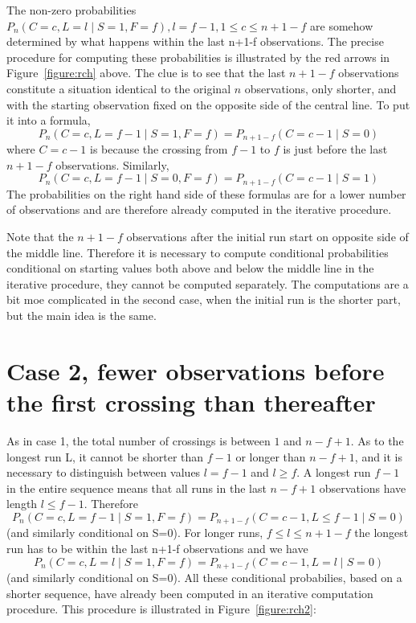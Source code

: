 The non-zero probabilities $P_n (C=c,L=l \mid S=1,F=f), l=f-1, 1 \leq c \leq n+1-f$ are somehow determined by what happens within the last n+1-f observations. The precise procedure for computing these probabilities is illustrated by the red arrows in Figure~\ref{figure:rch} above. The clue is to see that the last $n+1-f$ observations constitute a situation identical to the original $n$ observations, only shorter, and with the starting observation fixed on the opposite side of the central line. To put it into a formula, $$P_n (C=c,L=f-1 \mid S=1,F=f)=P_{n+1-f} (C=c-1 \mid S=0)$$ where $C=c-1$ is because the crossing from $f-1$ to $f$ is just before the last $n+1-f$ observations. Similarly, $$P_n (C=c,L=f-1 \mid S=0,F=f)=P_{n+1-f} (C=c-1 \mid S=1)$$ The probabilities on the right hand side of these formulas are for a lower number of observations and are therefore already computed in the iterative procedure. 

Note that the $n+1-f$ observations after the initial run start on opposite side of the middle line. Therefore it is necessary to compute conditional probabilities conditional on starting values both above and below the middle line in the iterative procedure, they cannot be computed separately. The computations are a bit moe complicated in the second case, when the initial run is the shorter part, but the main idea is the same.

\section{Case 2, fewer observations before the first crossing than thereafter}

As in case 1, the total number of crossings is between $1$ and $n-f+1$. As to the longest run L, it cannot be shorter than $f-1$ or longer than $n-f+1$, and it is necessary to distinguish between values $l=f-1$ and $l \geq f$. A longest run $f-1$ in the entire sequence means that all runs in the last $n-f+1$ observations have length $l \leq f-1$. Therefore $$P_n (C=c,L=f-1 \mid S=1,F=f) = P_{n+1-f} (C=c-1,L \leq f-1 \mid S=0)$$
(and similarly conditional on S=0). For longer runs, $f \leq l \leq n+1-f$ the longest run has to be within the last n+1-f observations and we have $$P_n (C=c,L=l \mid S=1,F=f) = P_{n+1-f} (C=c-1,L=l \mid S=0)$$
(and similarly conditional on S=0). All these conditional probabilies, based on a shorter sequence, have already been computed in an iterative computation procedure. This procedure is illustrated in Figure~\ref{figure:rch2}:

